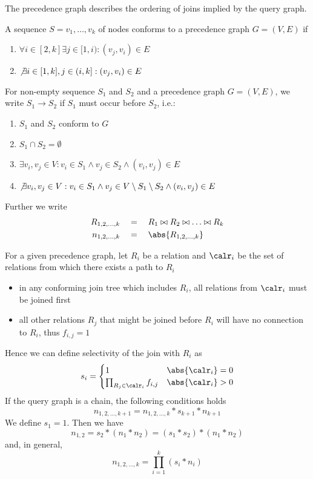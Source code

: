 \documentclass[11pt]{article}
\begin{document}
The precedence graph describes the ordering of joins implied by the query graph.

A sequence \(S=v_1,\dots,v_k\) of nodes conforms to a precedence graph \(G=(V,E)\) if
\begin{enumerate}
\item \(\forall i\in[2,k]\exists j\in[1,i):(v_j,v_i)\in E\)
\item \(\not\exists i\in[1,k],j\in(i,k]:(v_j,v_i)\in E\)
\end{enumerate}

For non-empty sequence \(S_1\) and \(S_2\) and a precedence graph \(G=(V,E)\), we write \(S_1\to S_2\) if \(S_1\)
must occur before \(S_2\), i.e.:
\begin{enumerate}
\item \(S_1\) and \(S_2\) conform to \(G\)
\item \(S_1\cap S_2=\emptyset\)
\item \(\exists v_i,v_j\in V:v_i\in S_1\wedge v_j\in S_2\wedge(v_i,v_j)\in E\)
\item \(\not\exists v_i,v_j\in V:v_i\in S_1\wedge v_j\in V\setminus S_1\setminus S_2\wedge(v_i,v_j)\in E\)
\end{enumerate}
Further we write
\begin{align*}
R_{1,2,\dots,k}&\quad=\quad R_1\bowtie R_2\bowtie\dots\bowtie R_k\\
n_{1,2,\dots,k}&\quad=\quad \abs{R_{1,2,\dots,k}}
\end{align*}

For a given precedence graph, let \(R_i\) be a relation and \(\calr_i\) be the set of relations from which there
exists a path to \(R_i\)
\begin{itemize}
\item in any conforming join tree which includes \(R_i\), all relations from \(\calr_i\) must be joined first
\item all other relations \(R_j\) that might be joined before \(R_i\) will have no connection to \(R_i\),
thus \(f_{i,j}=1\)
\end{itemize}

Hence we can define selectivity of the join with \(R_i\) as
\begin{equation*}
s_i=
\begin{cases}
1&\abs{\calr_i}=0\\
\prod_{R_j\in\calr_i}f_{i,j}&\abs{\calr_i}>0
\end{cases}
\end{equation*}
If the query graph is a chain, the following conditions holds
\begin{equation*}
n_{1,2,\dots,k+1}=n_{1,2,\dots,k}*s_{k+1}*n_{k+1}
\end{equation*}
We define \(s_1=1\). Then we have
\begin{equation*}
n_{1,2}=s_2*(n_1*n_2)=(s_1*s_2)*(n_1*n_2)
\end{equation*}
and, in general,
\begin{equation*}
n_{1,2,\dots,k}=\prod_{i=1}^k(s_i*n_i)
\end{equation*}
\end{document}
